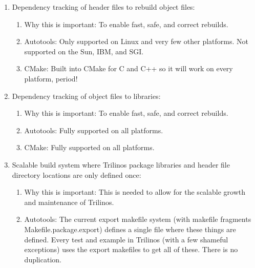 \documentclass[pdf,ps2pdf,11pt]{SANDreport}
\begin{document}
\begin{enumerate}

{}\item Dependency tracking of header files to rebuild object files:

  \begin{enumerate}

  {}\item Why this is important: To enable fast, safe, and correct rebuilds.

  {}\item Autotools: Only supported on Linux and very few other
  platforms.  Not supported on the Sun, IBM, and SGI.

  {}\item CMake: Built into CMake for C and C++ so it will work on
  every platform, period!

  \end{enumerate}

{}\item Dependency tracking of object files to libraries:

  \begin{enumerate}

  {}\item Why this is important: To enable fast, safe, and correct rebuilds.

  {}\item Autotools: Fully supported on all platforms.

  {}\item CMake: Fully supported on all platforms.

  \end{enumerate}

{}\item Scalable build system where Trilinos package libraries and
header file directory locations are only defined once:

  \begin{enumerate}

  {}\item Why this is important: This is needed to allow for the
  scalable growth and maintenance of Trilinos.

  {}\item Autotools: The current export makefile system (with makefile
  fragments Makefile.package.export) defines a single file where these
  things are defined.  Every test and example in Trilinos (with a few
  shameful exceptions) uses the export makefiles to get all of these.
  There is no duplication.


\end{enumerate}
\end{enumerate}
\end{document}
